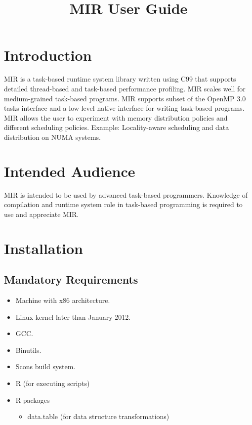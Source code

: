 \documentclass[11pt,a4paper]{article}
\title{MIR User Guide}
\begin{document}
\maketitle

\section{Introduction}\label{introduction}

MIR is a task-based runtime system library written using C99 that supports detailed thread-based and task-based performance profiling. MIR scales well for medium-grained task-based programs. MIR supports subset of the OpenMP 3.0 tasks interface and a low level native interface for writing task-based programs. MIR allows the user to experiment with memory distribution policies and different scheduling policies. Example: Locality-aware scheduling and data distribution on NUMA systems.

\section{Intended Audience}\label{intended-audience}

MIR is intended to be used by advanced task-based programmers. Knowledge of compilation and runtime system role in task-based programming is required to use and appreciate MIR.

\section{Installation}\label{installation}

\subsection{Mandatory Requirements}\label{mandatory-requirements}

\begin{itemize}
  \item Machine with x86 architecture.
  \item Linux kernel later than January 2012.
  \item GCC.
  \item Binutils.
  \item Scons build system.
  \item R (for executing scripts)
  \item R packages
  \begin{itemize}
      \item data.table (for data structure transformations)
  \end{itemize}
\end{itemize}
\end{document}
